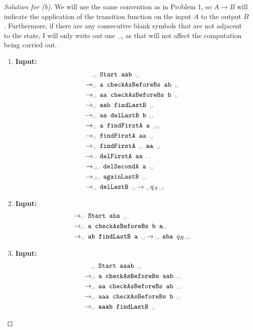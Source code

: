 \documentclass[11pt,a4paper]{article}
\newcommand{\bl}{\ensuremath{\text{\textvisiblespace}}}
\newcommand{\word}[1]{\text{\textbf{\texttt{#1}}}}
\begin{document}
\begin{proof}[Solution for (b)]
We will use the same convention as in Problem 1, so $A \to B$ will indicate the application of the transition function on the input $A$ to the output $B$. Furthermore, if there are any consecutive blank symbols that are not adjacent to the state, I will only write out one \bl, as that will not affect the computation being carried out.
 \begin{enumerate}
  \item   \textbf{Input:} \word{aab} 
\begin{align*}
&   \bl \texttt{ Start aab } \bl \\
\to & \bl \texttt{ a checkAsBeforeBs ab } \bl \\
\to & \bl \texttt{ aa checkAsBeforeBs b } \bl \\
\to & \bl \texttt{ aab findLastB } \bl \\
\to & \bl \texttt{ aa delLastB b }  \bl \\
\to & \bl \texttt{ a findFirstA a } \bl \bl \\
\to & \bl \texttt{ findFirstA aa } \bl \\
\to & \bl \texttt{ findFirstA } \bl \texttt{ aa } \bl \\
\to & \bl \texttt{ delFirstA aa } \bl \\
\to & \bl \bl \texttt{ delSecondA a  } \bl \\
\to & \bl \bl \texttt{ againLastB } \bl \\
\to & \bl \texttt{ delLastB } \bl \to \bl \, q_{A} \, \bl.
\end{align*}
  \item   \textbf{Input:} \word{aba} 
\begin{align*}
\to & \bl \texttt{ Start aba } \bl \\
\to & \bl \texttt{ a checkAsBeforeBs b a} \bl  \\
\to & \bl \texttt{ ab findLastB a } \bl \to \bl \texttt{ aba } q_R \, \bl.
\end{align*}
  \item   \textbf{Input:} \word{aaab} 
\begin{align*}
 & \bl \texttt{ Start aaab } \bl \\
\to & \bl \texttt{ a checkAsBeforeBs aab } \bl \\
\to & \bl \texttt{ aa checkAsBeforeBs ab } \bl \\
\to & \bl \texttt{ aaa checkAsBeforeBs b } \bl \\
\to & \bl \texttt{ aaab findLastB } \bl \\

\end{align*}
\end{enumerate}
\end{proof}
\end{document}
